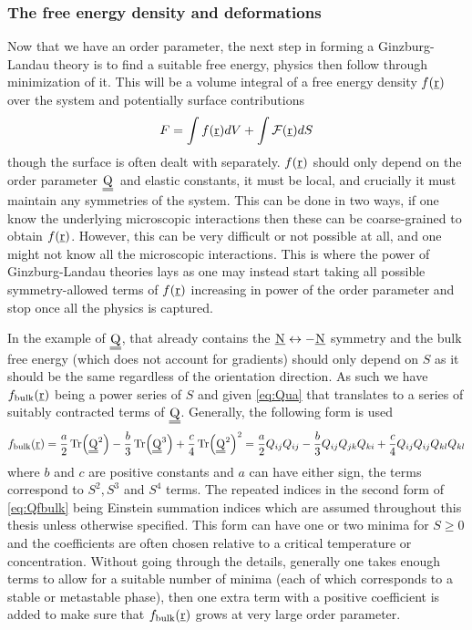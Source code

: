 \documentclass[12pt]{article}
\newcommand{\suf}[2]{\stackunder[1pt]{#1}{\rule{\widthof{#2}*\real{1.1}}{.1ex}}}
\newcommand{\duf}[2]{\stackunder[1pt]{\suf{#1}{#2}}{\rule{\widthof{#2}*\real{1.1}}{.1ex}}}
\newcommand{\su}[1]{\suf{#1}{#1}}
\newcommand{\du}[1]{\duf{#1}{#1}}
\newcommand{\QQ}{$\du{Q}$}
\begin{document}
\subsubsection{The free energy density and deformations}
Now that we have an order parameter, the next step in forming a Ginzburg-Landau theory is to find a suitable free energy, physics then follow through minimization of it.
This will be a volume integral of a free energy density $f(\su{r})$ over the system and potentially surface contributions
\begin{equation}
    F = \int f(\su{r}) dV + \int \mathcal{F}(\su{r}) dS
\end{equation}
though the surface is often dealt with separately.
$f(\su{r})$ should only depend on the order parameter \QQ\ and elastic constants, it must be local, and crucially it must maintain any symmetries of the system\cite{kardarStatisticalPhysicsFields2007,reichlModernCourseStatistical2016}.
This can be done in two ways, if one know the underlying microscopic interactions then these can be coarse-grained to obtain $f(\su{r})$.
However, this can be very difficult or not possible at all, and one might not know all the microscopic interactions.
This is where the power of Ginzburg-Landau theories lays as one may instead start taking all possible symmetry-allowed terms of $f(\su{r})$ increasing in power of the order parameter and stop once all the physics is captured.

In the example of \QQ, that already contains the $\su{N} \leftrightarrow -\su{N}$ symmetry and the bulk free energy (which does not account for gradients) should only depend on $S$ as it should be the same regardless of the orientation direction.
As such we have $f_\text{bulk}(\su{r})$ being a power series of $S$ and given \cref{eq:Qua} that translates to a series of suitably contracted terms of \QQ.
Generally, the following form is used
\begin{equation}\label{eq:Qfbulk}
    f_\text{bulk}(\su{r}) = \frac{a}{2} \Tr(\du{Q}^2) - \frac{b}{3} \Tr(\du{Q}^3) + \frac{c}{4} \Tr(\du{Q}^2)^2 = \frac{a}{2} Q_{ij}Q_{ij} - \frac{b}{3} Q_{ij}Q_{jk}Q_{ki} + \frac{c}{4} Q_{ij}Q_{ij}Q_{kl}Q_{kl}
\end{equation}
where $b$ and $c$ are positive constants and $a$ can have either sign, the terms correspond to $S^2, S^3$ and $S^4$ terms\cite{brayTheoryPhaseOrdering1993,luckhurstBiaxialNematicLiquid2015}.
The repeated indices in the second form of \cref{eq:Qfbulk} being Einstein summation indices which are assumed throughout this thesis unless otherwise specified.
This form can have one or two minima for $S\geq0$ and the coefficients are often chosen relative to a critical temperature or concentration.
Without going through the details, generally one takes enough terms to allow for a suitable number of minima (each of which corresponds to a stable or metastable phase), then one extra term with a positive coefficient is added to make sure that $f_\text{bulk}(\su{r})$ grows at very large order parameter.
\end{document}

